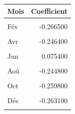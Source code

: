 \centering
\centering
\begin{tabular}[t]{lr}
\toprule
Mois & Coefficient\\
\midrule
\cellcolor{gray!10}{Jan} & \cellcolor{gray!10}{-0.264800}\\
Fév & -0.266500\\
\cellcolor{gray!10}{Mar} & \cellcolor{gray!10}{-0.268500}\\
Avr & -0.246400\\
\cellcolor{gray!10}{Mai} & \cellcolor{gray!10}{0.152000}\\
Jun & 0.075400\\
\cellcolor{gray!10}{Jul} & \cellcolor{gray!10}{0.067800}\\
Aoû & -0.244800\\
\cellcolor{gray!10}{Sep} & \cellcolor{gray!10}{-0.254300}\\
Oct & -0.259800\\
\cellcolor{gray!10}{Nov} & \cellcolor{gray!10}{-0.261400}\\
Déc & -0.263100\\
\cellcolor{gray!10}{Somme} & \cellcolor{gray!10}{-2.034397}\\
\bottomrule
\end{tabular}

